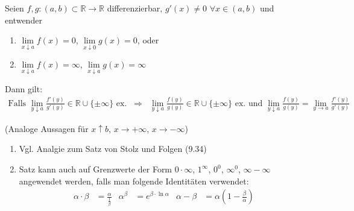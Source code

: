 \begin{proposition}
	Seien $f,g:(a,b)\subset\mathbb{R}\to\mathbb{R}$ \gls{differenzierbar}, $g'(x) \neq 0$ $\forall x\in(a,b)$ und entwender
	\begin{enumerate}[label={\roman*)}]
		\item $\lim\limits_{x\downarrow a} f(x) = 0$, $\lim\limits_{x\downarrow 0} g(x) = 0$, oder
		\item $\lim\limits_{x\downarrow a} f(x) =\infty$, $\lim\limits_{x\downarrow a} g(x) = \infty$
	\end{enumerate}

	Dann gilt:
	\begin{align}
		\text{Falls $\lim\limits_{y\downarrow a} \frac{f'(y)}{g'(y)} \in\mathbb{R}\cup \{ \pm\infty \}$ ex.} \;\; \Rightarrow \;\; \lim\limits_{y\downarrow a} \frac{f(y)}{g(y)} \in\mathbb{R}\cup \{ \pm\infty \}\text{ ex. und }\lim\limits_{y\downarrow a} \frac{f(y)}{g(y)} = \lim\limits_{y\to a} \frac{f'(y)}{g'(y)}
	\end{align}
	
	(Analoge Aussagen für $x\uparrow b$, $x\to +\infty$, $x\to-\infty$)
\end{proposition}

\begin{remark}
	\vspace*{0pt}
	\begin{enumerate}[label={\arabic*)},topsep=\dimexpr-\baselineskip/2\relax]
		\item Vgl. Analgie zum Satz von Stolz und Folgen (9.34)
		\item Satz kann auch auf Grenzwerte der Form $0\cdot \infty$, $1^{\infty}$, $0^0$, $\infty^0$, $\infty - \infty$ angewendet werden, falls man folgende Identitäten verwendet: \begin{align*}
			\alpha\cdot\beta &= \frac{\alpha}{\frac{1}{\beta}} & \alpha^\beta &= e^{\beta \cdot \ln \alpha} & \alpha - \beta &= \alpha \left( 1 - \frac{\beta}{\alpha} \right)
		\end{align*}
	\end{enumerate}
\end{remark}


